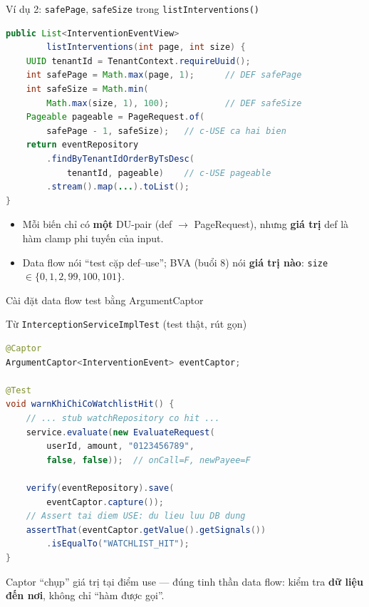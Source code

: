 \documentclass[aspectratio=169,12pt]{beamer}
\begin{document}
\begin{frame}[fragile]{Ví dụ 2: \texttt{safePage}, \texttt{safeSize} trong \texttt{listInterventions()}}
  \vspace*{-0.45em}
\begin{lstlisting}[language=java,basicstyle=\ttfamily\scriptsize]
public List<InterventionEventView>
        listInterventions(int page, int size) {
    UUID tenantId = TenantContext.requireUuid();
    int safePage = Math.max(page, 1);      // DEF safePage
    int safeSize = Math.min(
        Math.max(size, 1), 100);           // DEF safeSize
    Pageable pageable = PageRequest.of(
        safePage - 1, safeSize);   // c-USE ca hai bien
    return eventRepository
        .findByTenantIdOrderByTsDesc(
            tenantId, pageable)    // c-USE pageable
        .stream().map(...).toList();
}
\end{lstlisting}

  \begin{itemize}
    \item Mỗi biến chỉ có \textbf{một} DU-pair (def $\to$ PageRequest),
          nhưng \textbf{giá trị} def là hàm clamp phi tuyến của input.
    \item Data flow nói ``test cặp def--use''; BVA (buổi 8) nói
          \textbf{giá trị nào}: \texttt{size} $\in \{0, 1, 2, 99, 100, 101\}$.
  \end{itemize}
\end{frame}

\begin{frame}[fragile]{Cài đặt data flow test bằng ArgumentCaptor}
  \begin{block}{Từ \texttt{InterceptionServiceImplTest} (test thật, rút gọn)}
\begin{lstlisting}[language=java,basicstyle=\ttfamily\scriptsize]
@Captor
ArgumentCaptor<InterventionEvent> eventCaptor;

@Test
void warnKhiChiCoWatchlistHit() {
    // ... stub watchRepository co hit ...
    service.evaluate(new EvaluateRequest(
        userId, amount, "0123456789",
        false, false));  // onCall=F, newPayee=F

    verify(eventRepository).save(
        eventCaptor.capture());
    // Assert tai diem USE: du lieu luu DB dung
    assertThat(eventCaptor.getValue().getSignals())
        .isEqualTo("WATCHLIST_HIT");
}
\end{lstlisting}
  \end{block}
  Captor ``chụp'' giá trị tại điểm use --- đúng tinh thần data flow:
  kiểm tra \textbf{dữ liệu đến nơi}, không chỉ ``hàm được gọi''.
\end{frame}
\end{document}
